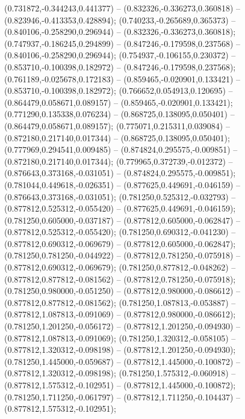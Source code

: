  (0.731872,-0.344243,0.441377) -- (0.832326,-0.336273,0.360818) -- (0.823946,-0.413353,0.428894);
 (0.740233,-0.265689,0.365373) -- (0.840106,-0.258290,0.296944) -- (0.832326,-0.336273,0.360818);
 (0.747937,-0.186245,0.294899) -- (0.847246,-0.179598,0.237568) -- (0.840106,-0.258290,0.296944);
 (0.754937,-0.106155,0.230372) -- (0.853710,-0.100398,0.182972) -- (0.847246,-0.179598,0.237568);
 (0.761189,-0.025678,0.172183) -- (0.859465,-0.020901,0.133421) -- (0.853710,-0.100398,0.182972);
 (0.766652,0.054913,0.120695) -- (0.864479,0.058671,0.089157) -- (0.859465,-0.020901,0.133421);
 (0.771290,0.135338,0.076234) -- (0.868725,0.138095,0.050401) -- (0.864479,0.058671,0.089157);
 (0.775071,0.215311,0.039084) -- (0.872180,0.217140,0.017344) -- (0.868725,0.138095,0.050401);
 (0.777969,0.294541,0.009485) -- (0.874824,0.295575,-0.009851) -- (0.872180,0.217140,0.017344);
 (0.779965,0.372739,-0.012372) -- (0.876643,0.373168,-0.031051) -- (0.874824,0.295575,-0.009851);
 (0.781044,0.449618,-0.026351) -- (0.877625,0.449691,-0.046159) -- (0.876643,0.373168,-0.031051);
 (0.781250,0.525312,-0.032793) -- (0.877812,0.525312,-0.055420) -- (0.877625,0.449691,-0.046159);
 (0.781250,0.605000,-0.037187) -- (0.877812,0.605000,-0.062847) -- (0.877812,0.525312,-0.055420);
 (0.781250,0.690312,-0.041230) -- (0.877812,0.690312,-0.069679) -- (0.877812,0.605000,-0.062847);
 (0.781250,0.781250,-0.044922) -- (0.877812,0.781250,-0.075918) -- (0.877812,0.690312,-0.069679);
 (0.781250,0.877812,-0.048262) -- (0.877812,0.877812,-0.081562) -- (0.877812,0.781250,-0.075918);
 (0.781250,0.980000,-0.051250) -- (0.877812,0.980000,-0.086612) -- (0.877812,0.877812,-0.081562);
 (0.781250,1.087813,-0.053887) -- (0.877812,1.087813,-0.091069) -- (0.877812,0.980000,-0.086612);
 (0.781250,1.201250,-0.056172) -- (0.877812,1.201250,-0.094930) -- (0.877812,1.087813,-0.091069);
 (0.781250,1.320312,-0.058105) -- (0.877812,1.320312,-0.098198) -- (0.877812,1.201250,-0.094930);
 (0.781250,1.445000,-0.059687) -- (0.877812,1.445000,-0.100872) -- (0.877812,1.320312,-0.098198);
 (0.781250,1.575312,-0.060918) -- (0.877812,1.575312,-0.102951) -- (0.877812,1.445000,-0.100872);
 (0.781250,1.711250,-0.061797) -- (0.877812,1.711250,-0.104437) -- (0.877812,1.575312,-0.102951);
